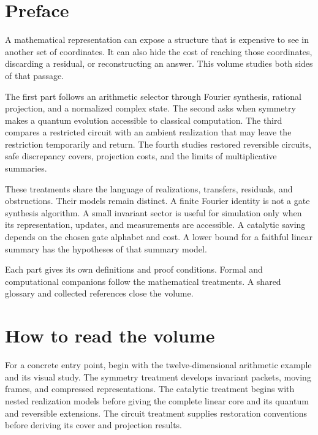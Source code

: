 

\VolumeCover
\frontmatter
\chapter*{Preface}
A mathematical representation can expose a structure that is expensive to see in another set of coordinates. It can also hide the cost of reaching those coordinates, discarding a residual, or reconstructing an answer. This volume studies both sides of that passage.

The first part follows an arithmetic selector through Fourier synthesis, rational projection, and a normalized complex state. The second asks when symmetry makes a quantum evolution accessible to classical computation. The third compares a restricted circuit with an ambient realization that may leave the restriction temporarily and return. The fourth studies restored reversible circuits, safe discrepancy covers, projection costs, and the limits of multiplicative summaries.

These treatments share the language of realizations, transfers, residuals, and obstructions. Their models remain distinct. A finite Fourier identity is not a gate synthesis algorithm. A small invariant sector is useful for simulation only when its representation, updates, and measurements are accessible. A catalytic saving depends on the chosen gate alphabet and cost. A lower bound for a faithful linear summary has the hypotheses of that summary model.

Each part gives its own definitions and proof conditions. Formal and computational companions follow the mathematical treatments. A shared glossary and collected references close the volume.

\chapter*{How to read the volume}
For a concrete entry point, begin with the twelve-dimensional arithmetic example and its visual study. The symmetry treatment develops invariant packets, moving frames, and compressed representations. The catalytic treatment begins with nested realization models before giving the complete linear core and its quantum and reversible extensions. The circuit treatment supplies restoration conventions before deriving its cover and projection results.

